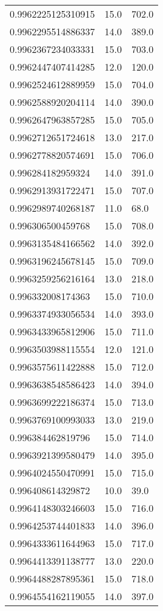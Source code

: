 \begin{center}
\begin{supertabular}[H]{p{0.30\textwidth}p{0.05\textwidth}p{0.05\textwidth}}
0.9962225125310915 & 15.0 & 702.0 \\ 
0.9962295514886337 & 14.0 & 389.0 \\ 
0.9962367234033331 & 15.0 & 703.0 \\ 
0.9962447407414285 & 12.0 & 120.0 \\ 
0.9962524612889959 & 15.0 & 704.0 \\ 
0.9962588920204114 & 14.0 & 390.0 \\ 
0.9962647963857285 & 15.0 & 705.0 \\ 
0.9962712651724618 & 13.0 & 217.0 \\ 
0.9962778820574691 & 15.0 & 706.0 \\ 
0.996284182959324 & 14.0 & 391.0 \\ 
0.9962913931722471 & 15.0 & 707.0 \\ 
0.9962989740268187 & 11.0 & 68.0 \\ 
0.996306500459768 & 15.0 & 708.0 \\ 
0.9963135484166562 & 14.0 & 392.0 \\ 
0.9963196245678145 & 15.0 & 709.0 \\ 
0.9963259256216164 & 13.0 & 218.0 \\ 
0.996332008174363 & 15.0 & 710.0 \\ 
0.9963374933056534 & 14.0 & 393.0 \\ 
0.9963433965812906 & 15.0 & 711.0 \\ 
0.9963503988115554 & 12.0 & 121.0 \\ 
0.9963575611422888 & 15.0 & 712.0 \\ 
0.9963638548586423 & 14.0 & 394.0 \\ 
0.9963699222186374 & 15.0 & 713.0 \\ 
0.9963769100993033 & 13.0 & 219.0 \\ 
0.996384462819796 & 15.0 & 714.0 \\ 
0.9963921399580479 & 14.0 & 395.0 \\ 
0.9964024550470991 & 15.0 & 715.0 \\ 
0.996408614329872 & 10.0 & 39.0 \\ 
0.9964148303246603 & 15.0 & 716.0 \\ 
0.9964253744401833 & 14.0 & 396.0 \\ 
0.9964333611644963 & 15.0 & 717.0 \\ 
0.9964413391138777 & 13.0 & 220.0 \\ 
0.9964488287895361 & 15.0 & 718.0 \\ 
0.9964554162119055 & 14.0 & 397.0 \\ 

\end{supertabular}
\end{center}
